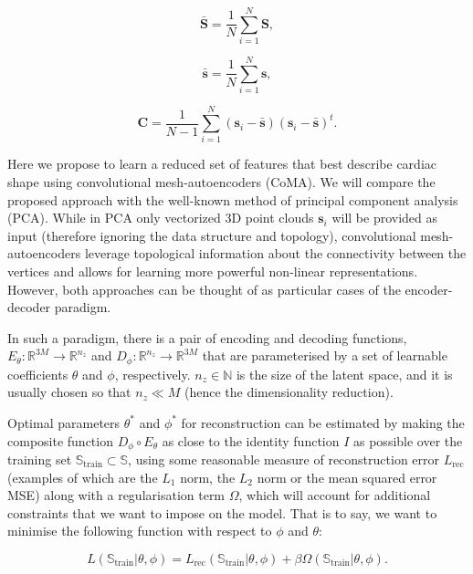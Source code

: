 \begin{equation}
\bar{\textbf{S}}=\frac{1}{N}\sum_{i=1}^{N}{\textbf{S}},
\end{equation}

\begin{equation}
\bar{\textbf{s}}=\frac{1}{N}\sum_{i=1}^{N}{\textbf{s}},
\end{equation}

\begin{equation}
\textbf{C}=\frac{1}{N-1}\sum_{i=1}^{N}({\textbf{s}}_i-\bar{\textbf{s}})({\textbf{s}}_i-\bar{\textbf{s}})^t.
\end{equation}

Here we propose to learn a reduced set of features that best describe cardiac shape using convolutional mesh-autoencoders (CoMA). We will compare the proposed approach with the well-known method of principal component analysis (PCA). While in PCA only vectorized 3D point clouds $\textbf{s}_i$ will be provided as input (therefore ignoring the data structure and topology), convolutional mesh-autoencoders leverage topological information about the connectivity between the vertices and allows for learning more powerful non-linear representations. However, both approaches can be thought of as particular cases of the encoder-decoder paradigm.

In such a paradigm, there is a pair of encoding and decoding functions, $E_{\theta}:\mathbb{R}^{3M}\rightarrow\mathbb{R}^{n_z}$ and $D_{\phi}:\mathbb{R}^{n_z}\rightarrow\mathbb{R}^{3M}$ that are parameterised by a set of learnable coefficients $\theta$ and $\phi$, respectively. $n_z\in\mathbb{N}$ is the size of the latent space, and it is usually chosen so that $n_z\ll M$ (hence the dimensionality reduction). 

Optimal parameters $\theta^*$ and $\phi^*$ for reconstruction can be estimated by making the composite function $D_{\phi} \circ E_{\theta}$ as close to the identity function $I$ as possible over the training set $\mathbb{S}_\text{train}\subset\mathbb{S}$, using some reasonable measure of reconstruction error $L_{\text{rec}}$ (examples of which are the $L_1$ norm, the $L_2$ norm or the mean squared error MSE) along with a regularisation term $\Omega$, which will account for additional constraints that we want to impose on the model. That is to say, we want to minimise the following function with respect to $\phi$ and $\theta$: 

\begin{equation}
L(\mathbb{S}_\text{train}|\theta, \phi)=
L_{\text{rec}}(\mathbb{S}_\text{train}|\theta, \phi)+
\beta\Omega(\mathbb{S}_\text{train}|\theta, \phi).
\label{eq_loss_function}
\end{equation}

